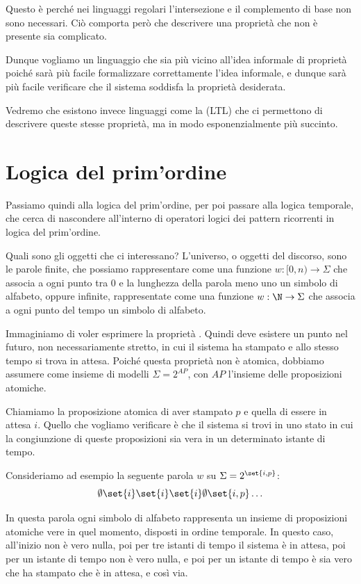Questo è perché nei linguaggi regolari l'intersezione e il complemento di base non sono necessari. Ciò comporta però che descrivere una proprietà che non è presente sia complicato.

Dunque vogliamo un linguaggio che sia più vicino all'idea informale di proprietà poiché sarà più facile formalizzare correttamente l'idea informale, e dunque sarà più facile verificare che il sistema soddisfa la proprietà desiderata.

Vedremo che esistono invece linguaggi come la  (LTL) che ci permettono di descrivere queste stesse proprietà, ma in modo esponenzialmente più succinto.


\section{Logica del prim'ordine}
Passiamo quindi alla logica del prim'ordine, per poi passare alla logica temporale, che cerca di nascondere all'interno di operatori logici dei pattern ricorrenti in logica del prim'ordine.

Quali sono gli oggetti che ci interessano? L'universo, o oggetti del discorso, sono le parole finite, che possiamo rappresentare come una funzione \(w: \lbrack 0,n\rparen\to \Sigma\) che associa a ogni punto tra \(0\) e la lunghezza della parola meno uno un simbolo di alfabeto, oppure infinite, rappresentate come una funzione \(w: \N \to \Sigma\) che associa a ogni punto del tempo un simbolo di alfabeto.

Immaginiamo di voler esprimere la proprietà . Quindi deve esistere un punto nel futuro, non necessariamente stretto, in cui il sistema ha stampato e allo stesso tempo si trova in attesa.
Poiché questa proprietà non è atomica, dobbiamo assumere come insieme di modelli \(\Sigma = 2^{AP}\), con \(AP\) l'insieme delle proposizioni atomiche.

Chiamiamo la proposizione atomica di aver stampato \(p\) e quella di essere in attesa \(i\).
Quello che vogliamo verificare è che il sistema si trovi in uno stato in cui la congiunzione di queste proposizioni sia vera in un determinato istante di tempo.

Consideriamo ad esempio la seguente parola \(w\) su \(\Sigma =2^{\set{i,p}}\):
\[\emptyset\set{i}\set{i}\set{i}\emptyset\set{i,p}\ldots\]

In questa parola ogni simbolo di alfabeto rappresenta un insieme di proposizioni atomiche vere in quel momento, disposti in ordine temporale. In questo caso, all'inizio non è vero nulla, poi per tre istanti di tempo il sistema è in attesa, poi per un istante di tempo non è vero nulla, e poi per un istante di tempo è sia vero che ha stampato che è in attesa, e così via.

